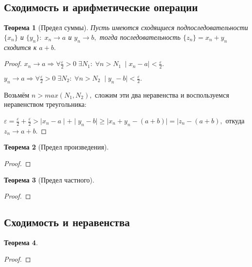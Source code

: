 \documentclass{article}
\newtheorem{Theorem}{Теорема}[section]
\begin{document}
\subsection{Сходимость и арифметические операции}
\begin{Theorem}[Предел суммы]

Пусть имеются сходящиеся подпоследовательности $\{x_n\}$ и $\{y_n\}: \; x_n\rightarrow a$ и $y_n\rightarrow b,$ тогда последовательность $\{z_n\}=x_n+y_n$ сходится к $a+b.$
\end{Theorem}
\begin{proof}
$x_n\rightarrow a \Rightarrow \forall \frac{\varepsilon}{2}>0 \; \exists N_1: \; \forall n>N_1 \; \mid x_n-a\mid<\frac{\varepsilon}{2}.$

$y_n\rightarrow a \Rightarrow \forall \frac{\varepsilon}{2}>0 \; \exists N_2: \; \forall n>N_2 \; \mid y_n-b\mid<\frac{\varepsilon}{2}.$

Возьмём $n>max(N_1, N_2),$ сложим эти два неравенства и воспользуемся неравенством треугольника:

$\varepsilon=\frac{\varepsilon}{2}+\frac{\varepsilon}{2}>\mid x_n-a\mid+\mid y_n-b\mid \geq \mid x_n+y_n-(a+b)\mid = \mid z_n-(a+b),$ откуда $z_n \rightarrow a+b.$
\end{proof}

\begin{Theorem}[Предел произведения]

\end{Theorem}
\begin{proof}

\end{proof}

\begin{Theorem}[Предел частного]

\end{Theorem}
\begin{proof}

\end{proof}

\subsection{Сходимость и неравенства}
\begin{Theorem}

\end{Theorem}
\begin{proof}

\end{proof}
\end{document}
